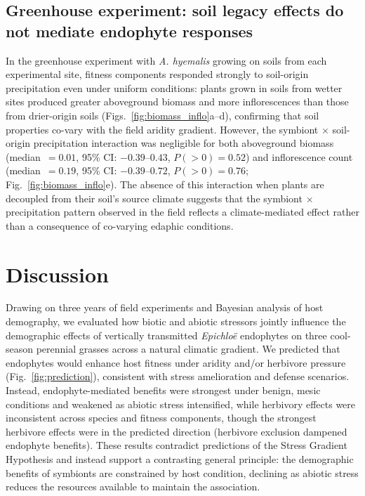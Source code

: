 \documentclass[12pt]{article}\usepackage[]{graphicx}\usepackage[dvipsnames]{xcolor}
\newcommand{\tom}[2]{{\color{red}{#1}}\footnote{\textit{\color{red}{#2}}}}
\begin{document}
 \subsection*{Greenhouse experiment: soil legacy effects do not mediate endophyte responses}
In the greenhouse experiment with \textit{A. hyemalis} growing on soils from each experimental site, fitness components responded strongly to soil-origin precipitation even under uniform conditions: plants grown in soils from wetter sites produced greater aboveground biomass and more inflorescences than those from drier-origin soils (Figs.~\ref{fig:biomass_inflo}a--d), confirming that soil properties co-vary with the field aridity gradient. 
However, the symbiont $\times$ soil-origin precipitation interaction was negligible for both aboveground biomass (median~$= 0.01$, 95\% CI: $-0.39$--$0.43$, $P(>0) = 0.52$) and inflorescence count (median~$= 0.19$, 95\% CI: $-0.39$--$0.72$, $P(>0) = 0.76$; Fig.~\ref{fig:biomass_inflo}e). 
The absence of this interaction when plants are decoupled from their soil's source climate suggests that the symbiont $\times$ precipitation pattern observed in the field reflects a climate-mediated effect rather than a consequence of co-varying edaphic conditions.

\section*{Discussion}
Drawing on three years of field experiments and Bayesian analysis of host demography, we evaluated how biotic and abiotic stressors jointly influence the demographic effects of vertically 
transmitted \textit{Epichloë} endophytes on three cool-season perennial grasses across a natural climatic gradient. 
We predicted that endophytes would enhance host fitness under aridity and/or herbivore pressure (Fig.~\ref{fig:prediction}), consistent with stress amelioration and defense scenarios. 
Instead, endophyte-mediated benefits were strongest under benign, mesic conditions and weakened as abiotic stress intensified, while herbivory effects were inconsistent across species and fitness components, though the strongest herbivore effects were in the predicted direction (herbivore exclusion dampened endophyte benefits). 
These results contradict predictions of the Stress Gradient Hypothesis and instead support a contrasting general principle: the demographic benefits of symbionts are constrained by host condition, declining as abiotic stress reduces the resources available to maintain the association.
\end{document}
